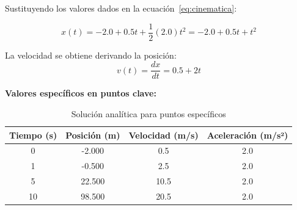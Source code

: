 \documentclass{article}
\begin{document}
	Sustituyendo los valores dados en la ecuación~\ref{eq:cinematica}:
	
	\begin{equation}
		x(t) = -2.0 + 0.5t + \frac{1}{2}(2.0)t^2 = -2.0 + 0.5t + t^2
	\end{equation}
	
	La velocidad se obtiene derivando la posición:
	\begin{equation}
		v(t) = \frac{dx}{dt} = 0.5 + 2t
	\end{equation}
	
	\textbf{Valores específicos en puntos clave:}
	\begin{table}[H]
		\centering
		\caption{Solución analítica para puntos específicos}
		\begin{tabular}{|c|c|c|c|}
			\hline
			\textbf{Tiempo (s)} & \textbf{Posición (m)} & \textbf{Velocidad (m/s)} & \textbf{Aceleración (m/s²)} \\
			\hline
			0 & -2.000 & 0.5 & 2.0 \\
			1 & -0.500 & 2.5 & 2.0 \\
			5 & 22.500 & 10.5 & 2.0 \\
			10 & 98.500 & 20.5 & 2.0 \\
			\hline
		\end{tabular}
	\end{table}
	
\end{document}
